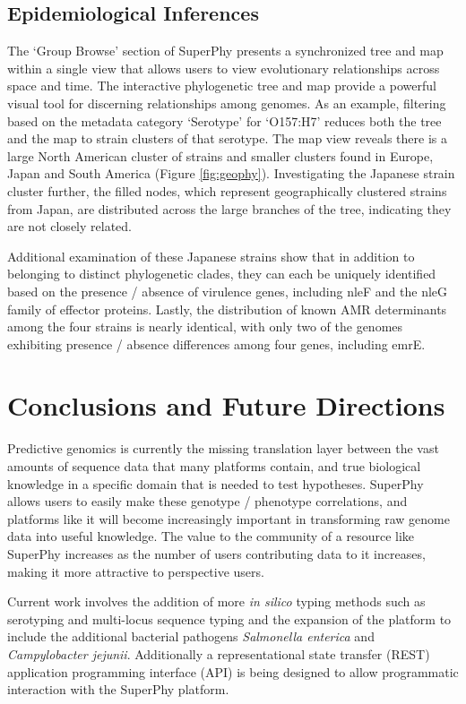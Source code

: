 \documentclass[doublespacing, linenumbers]{bmcart}
\begin{document}
\subsection{Epidemiological Inferences}
The `Group Browse' section of SuperPhy presents a synchronized tree and map within a single view that allows users to view evolutionary relationships across space and time. The interactive phylogenetic tree and map provide a powerful visual tool for discerning relationships among genomes. As an example, filtering based on the metadata category `Serotype' for `O157:H7' reduces both the tree and the map to strain clusters of that serotype. The map view reveals there is a large North American cluster of strains and smaller clusters found in Europe, Japan and South America (Figure \ref{fig:geophy}). Investigating the Japanese strain cluster further, the filled nodes, which represent geographically clustered strains from Japan, are distributed across the large branches of the tree, indicating they are not closely related.

Additional examination of these Japanese strains show that in addition to belonging to distinct phylogenetic clades, they can each be uniquely identified based on the presence / absence of virulence genes, including nleF and the nleG family of effector proteins. Lastly, the distribution of known AMR determinants among the four strains is nearly identical, with only two of the genomes exhibiting presence / absence differences among four genes, including emrE.

\section{Conclusions and Future Directions}
Predictive genomics is currently the missing translation layer between the vast amounts of sequence data that many platforms contain, and true biological knowledge in a specific domain that is needed to test hypotheses. SuperPhy allows users to easily make these genotype / phenotype correlations, and platforms like it will become increasingly important in transforming raw genome data into useful knowledge. The value to the community of a resource like SuperPhy increases as the number of users contributing data to it increases, making it more attractive to perspective users. 

Current work involves the addition of more \textit{in silico} typing methods such as serotyping and multi-locus sequence typing and the expansion of the platform to include the additional bacterial pathogens \textit{Salmonella enterica} and \textit{Campylobacter jejunii}. Additionally a representational state transfer (REST) application programming interface (API) is being designed to allow programmatic interaction with the SuperPhy platform.
 
\end{document}

